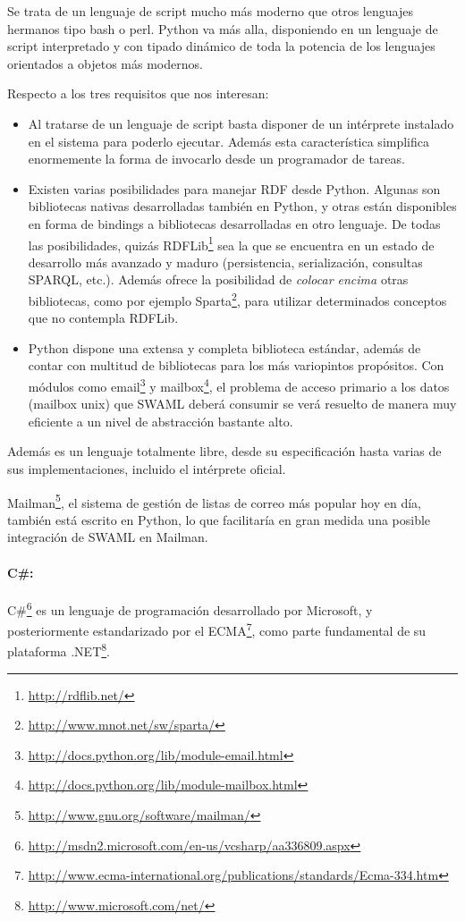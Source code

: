 Se trata de un lenguaje de script mucho más moderno que otros lenguajes hermanos 
tipo bash o perl. Python va más alla, disponiendo en un lenguaje de script 
interpretado y con tipado dinámico de toda la potencia de los lenguajes orientados 
a objetos más modernos.

Respecto a los tres requisitos que nos interesan:

\begin{itemize}
  \item Al tratarse de un lenguaje de script basta disponer de un intérprete 
	instalado en el sistema para poderlo ejecutar. Además esta característica
	simplifica enormemente la forma de invocarlo desde un programador de
	tareas.
  \item Existen varias posibilidades para manejar RDF desde Python. Algunas son
	bibliotecas nativas desarrolladas también en Python, y otras están
	disponibles en forma de bindings a bibliotecas desarrolladas en otro 
	lenguaje.
	De todas las posibilidades\cite{PracticalRDF}, quizás 
	RDFLib\footnote{\url{http://rdflib.net/}} sea la que se encuentra en 
	un estado de desarrollo más avanzado y maduro (persistencia, serialización, 
	consultas SPARQL, etc.).
	Además ofrece la posibilidad de \emph{colocar encima} otras bibliotecas,
	como por ejemplo Sparta\footnote{\url{http://www.mnot.net/sw/sparta/}},
	para utilizar determinados conceptos que no contempla RDFLib.
  \item Python dispone una extensa y completa biblioteca estándar, además de contar
	con multitud de bibliotecas para los más variopintos propósitos. Con módulos 
	como email\footnote{\url{http://docs.python.org/lib/module-email.html}} y
	mailbox\footnote{\url{http://docs.python.org/lib/module-mailbox.html}}, el
	problema de acceso primario a los datos (mailbox unix) que SWAML deberá
	consumir se verá resuelto de manera muy eficiente a un nivel de abstracción
	bastante alto.
\end{itemize}

Además es un lenguaje totalmente libre, desde su especificación hasta varias
de sus implementaciones, incluido el intérprete oficial.

Mailman\footnote{\url{http://www.gnu.org/software/mailman/}}, el sistema de gestión
de listas de correo más popular hoy en día, también está escrito en Python, lo que 
facilitaría en gran medida una posible integración de SWAML en Mailman.


\paragraph{C\#:}C\#\footnote{\url{http://msdn2.microsoft.com/en-us/vcsharp/aa336809.aspx}} 
es un lenguaje de programación desarrollado por Microsoft, y posteriormente estandarizado por el ECMA\footnote{\url{http://www.ecma-international.org/publications/standards/Ecma-334.htm}},
como parte fundamental de su plataforma .NET\footnote{\url{http://www.microsoft.com/net/}}.

